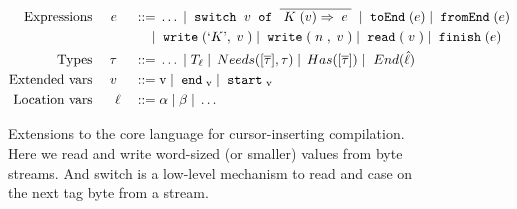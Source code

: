
\begin{figure}
  \vspace{-5mm}
  \begin{displaymath}
    \begin{aligned}
      \textup{Expressions} && \; {e} \; && 
     \; ::= \; & \ldots \; | \; \; \texttt{switch} \;{}\; v\; \; \texttt{of} \;\; \overline{{\; {K} \;(v)} \Rightarrow {\; {e} \;}} \; 
     \; | \;  \; \texttt{toEnd} \;(e)
     \; | \;  \; \texttt{fromEnd} \;(e)
     \\     
     && && \; | \; & \; \texttt{write} \;(`K\textrm',\; v \;)
           \; | \; \; \texttt{write} \;(\; n \;,\; v \;)
           \; | \; \; \texttt{read} \;(\; v \;) \; | \; 
      \; \texttt{finish} \;(e) \\      
      \textup{Types} && \; {\tau} \; && \; ::= \; & \ldots 
               \; | \; T_{\ell}
               \; | \; \, Needs([\overline{\tau}],\tau) \; | \; \, Has([\overline{\tau}]) 
               \; | \; \, \, End(\hat{\ell}) \\
      \textup{Extended vars} && \; v \; && \; ::= \; & 
           \textrm{v} \; | \; \; \texttt{end} \;_{\textrm{v}}
             \; | \; \; \texttt{start} \;_{\textrm{v}} \\
      \textup{Location vars} && \ell && \; ::= \; & \alpha \; | \; \beta \; | \; \ldots \\
    \end{aligned}
  \end{displaymath}
  \vspace{-4mm}
  \caption{Extensions to the core language for cursor-inserting compilation.
    Here we read and write word-sized (or smaller) values from byte streams. And
    switch is a low-level mechanism to read and case on the next tag byte from a
    stream.}
  \label{fig:target}
\end{figure}
